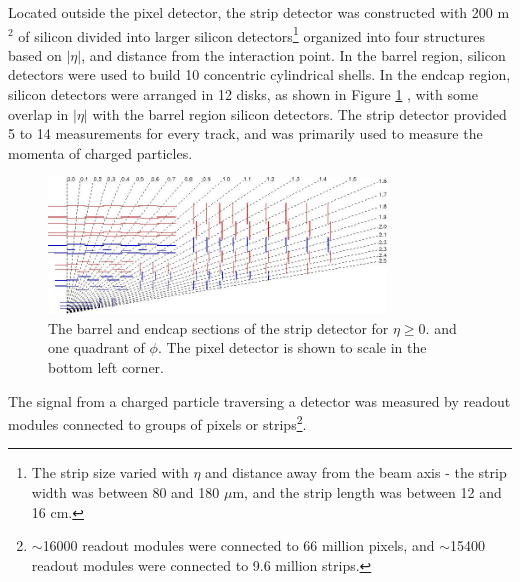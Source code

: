 Located outside the pixel detector, the strip detector was constructed with 200 m$^{2}$ of silicon divided into larger silicon detectors\footnote{The strip size varied with $\eta$ and 
distance away from the beam axis - the strip width was between 80 and 180 $\mu$m, and the strip length was between 12 and 16 cm.} organized 
into four structures based on $|\eta|$, and distance from the interaction point.  In the barrel region, silicon detectors 
were used to build 10 concentric cylindrical shells.  In the endcap region, silicon detectors 
were arranged in 12 disks, as shown in Figure \ref{fig:stripTracker} \cite{cmsTDR}, with some overlap in $|\eta|$ with the 
barrel region silicon detectors.  The strip detector provided 5 to 14 measurements for every track, and was primarily used to 
measure the momenta of charged particles.

\begin{figure}[ht]
	\centering
	\includegraphics[width=0.8\textwidth]{figures/siliconStripAndPixelDetectorTwoDimView.png}
	\caption{The barrel and endcap sections of the strip detector for $\eta \geq 0.$ and one quadrant of $\phi$.  
	The pixel detector is shown to scale in the bottom left corner.}
	\label{fig:stripTracker}
\end{figure}

The signal from a charged particle traversing a detector was measured by readout modules connected to groups of pixels or 
strips\footnote{$\sim$16000 readout modules were connected to 66 million pixels, and $\sim$15400 readout modules were connected 
to 9.6 million strips.}.

